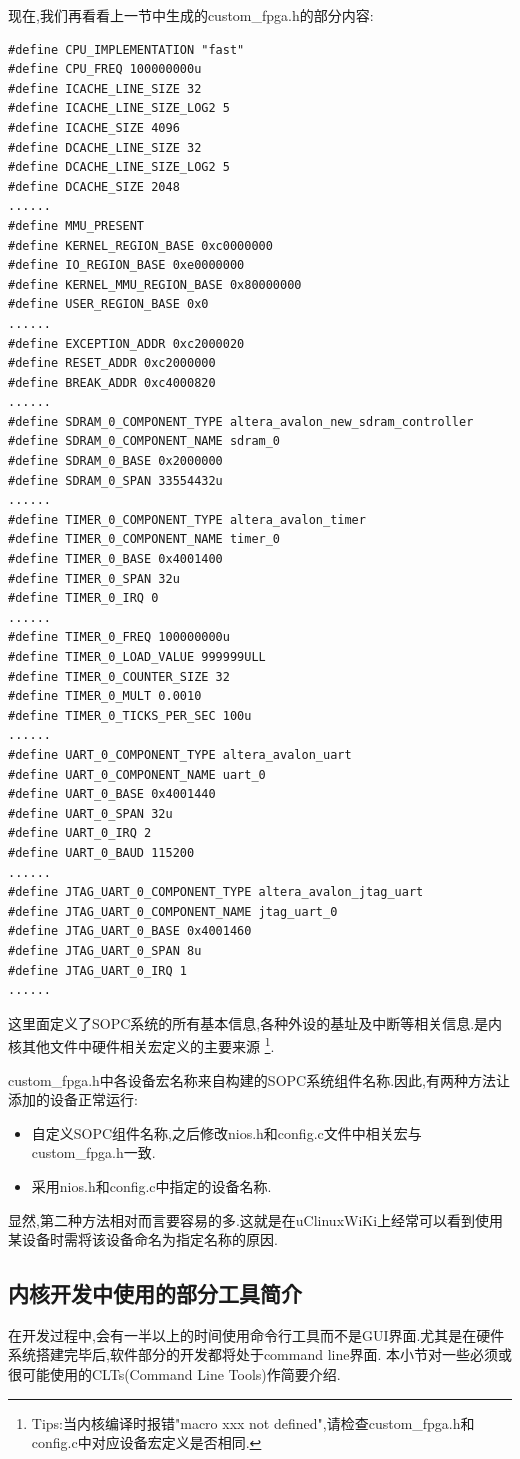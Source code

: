 \documentclass[12pt,a4paper,titlepage]{article}
\begin{document}
现在,我们再看看上一节中生成的custom\_fpga.h的部分内容:
\begin{verbatim}
#define CPU_IMPLEMENTATION "fast"
#define CPU_FREQ 100000000u
#define ICACHE_LINE_SIZE 32
#define ICACHE_LINE_SIZE_LOG2 5
#define ICACHE_SIZE 4096
#define DCACHE_LINE_SIZE 32
#define DCACHE_LINE_SIZE_LOG2 5
#define DCACHE_SIZE 2048
......
#define MMU_PRESENT 
#define KERNEL_REGION_BASE 0xc0000000
#define IO_REGION_BASE 0xe0000000
#define KERNEL_MMU_REGION_BASE 0x80000000
#define USER_REGION_BASE 0x0
......
#define EXCEPTION_ADDR 0xc2000020
#define RESET_ADDR 0xc2000000
#define BREAK_ADDR 0xc4000820
......
#define SDRAM_0_COMPONENT_TYPE altera_avalon_new_sdram_controller
#define SDRAM_0_COMPONENT_NAME sdram_0
#define SDRAM_0_BASE 0x2000000
#define SDRAM_0_SPAN 33554432u
......
#define TIMER_0_COMPONENT_TYPE altera_avalon_timer
#define TIMER_0_COMPONENT_NAME timer_0
#define TIMER_0_BASE 0x4001400
#define TIMER_0_SPAN 32u
#define TIMER_0_IRQ 0
......
#define TIMER_0_FREQ 100000000u
#define TIMER_0_LOAD_VALUE 999999ULL
#define TIMER_0_COUNTER_SIZE 32
#define TIMER_0_MULT 0.0010
#define TIMER_0_TICKS_PER_SEC 100u
......
#define UART_0_COMPONENT_TYPE altera_avalon_uart
#define UART_0_COMPONENT_NAME uart_0
#define UART_0_BASE 0x4001440
#define UART_0_SPAN 32u
#define UART_0_IRQ 2
#define UART_0_BAUD 115200
......
#define JTAG_UART_0_COMPONENT_TYPE altera_avalon_jtag_uart
#define JTAG_UART_0_COMPONENT_NAME jtag_uart_0
#define JTAG_UART_0_BASE 0x4001460
#define JTAG_UART_0_SPAN 8u
#define JTAG_UART_0_IRQ 1
......
\end{verbatim}
这里面定义了SOPC系统的所有基本信息,各种外设的基址及中断等相关信息.是内核其他文件中硬件相关宏定义的主要来源
\footnote{Tips:当内核编译时报错"macro xxx not defined",请检查custom\_fpga.h和config.c中对应设备宏定义是否相同.}.

custom\_fpga.h中各设备宏名称来自构建的SOPC系统组件名称.因此,有两种方法让添加的设备正常运行:
\begin{itemize}
\item 自定义SOPC组件名称,之后修改nios.h和config.c文件中相关宏与custom\_fpga.h一致.
\item 采用nios.h和config.c中指定的设备名称.
\end{itemize}
显然,第二种方法相对而言要容易的多.这就是在uClinuxWiKi上经常可以看到使用某设备时需将该设备命名为指定名称的原因.
\subsection{内核开发中使用的部分工具简介}
在开发过程中,会有一半以上的时间使用命令行工具而不是GUI界面.尤其是在硬件系统搭建完毕后,软件部分的开发都将处于command line界面.
本小节对一些必须或很可能使用的CLTs(Command Line Tools)作简要介绍.
\end{document}
